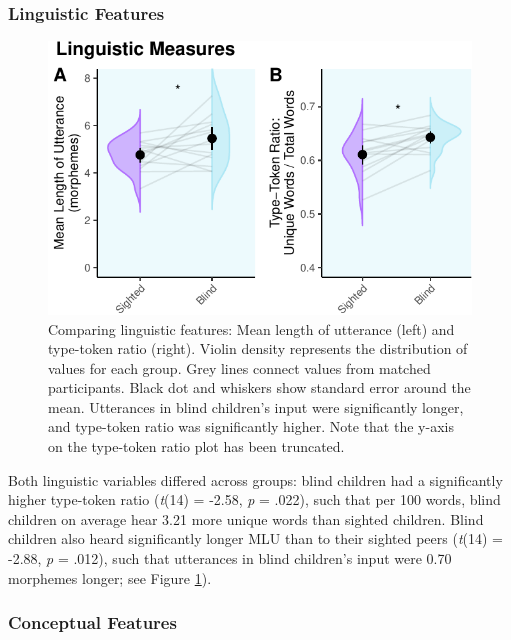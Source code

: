 \documentclass[
  man]{apa6}
\begin{document}
\hypertarget{linguistic-features-1}{%
\subsubsection{Linguistic Features}\label{linguistic-features-1}}

\begin{figure}
\centering
\includegraphics{input_quality_manuscript_files/figure-latex/linguistic-plots-1.pdf}
\caption{\label{fig:linguistic-plots}Comparing linguistic features: Mean length of utterance (left) and type-token ratio (right). Violin density represents the distribution of values for each group. Grey lines connect values from matched participants. Black dot and whiskers show standard error around the mean. Utterances in blind children's input were significantly longer, and type-token ratio was significantly higher. Note that the y-axis on the type-token ratio plot has been truncated.}
\end{figure}

Both linguistic variables differed across groups: blind children had a significantly higher type-token ratio (\emph{t}(14) = -2.58, \emph{p} = .022), such that per 100 words, blind children on average hear 3.21 more unique words than sighted children. Blind children also heard significantly longer MLU than to their sighted peers (\emph{t}(14) = -2.88, \emph{p} = .012), such that utterances in blind children's input were 0.70 morphemes longer; see Figure \ref{fig:linguistic-plots}).

\hypertarget{conceptual-features-1}{%
\subsubsection{Conceptual Features}\label{conceptual-features-1}}
\end{document}
